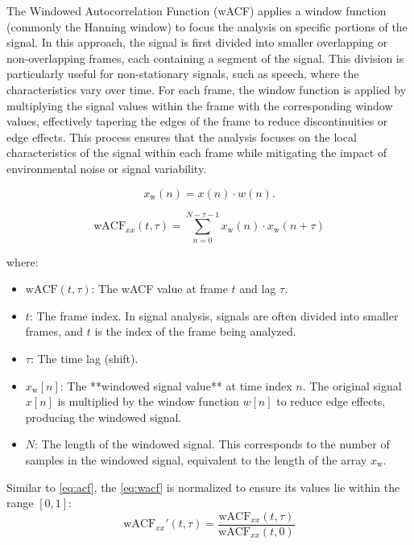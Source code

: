 \documentclass{ieeeaccess}
\begin{document}
The Windowed Autocorrelation Function (wACF) applies a window function (commonly the Hanning window) to focus the analysis on specific portions of the signal. In this approach, the signal is first divided into smaller overlapping or non-overlapping frames, each containing a segment of the signal. This division is particularly useful for non-stationary signals, such as speech, where the characteristics vary over time. For each frame, the window function is applied by multiplying the signal values within the frame with the corresponding window values, effectively tapering the edges of the frame to reduce discontinuities or edge effects. This process ensures that the analysis focuses on the local characteristics of the signal within each frame while mitigating the impact of environmental noise or signal variability.

\begin{equation}
x_{\text{w}}(n) = x(n) \cdot w(n).
\label{eq:windowed_signal}
\end{equation}


\begin{equation}
\text{wACF}_{xx}(t, \tau) = \sum_{n=0}^{N-\tau-1} x_{\text{w}}(n)\cdot x_{\text{w}}(n+\tau)
\label{eq:wacf}
\end{equation}


\noindent where:
\begin{itemize}
    \item $\text{wACF}(t, \tau)$: The wACF value at frame $t$ and lag $\tau$.
    \item $t$: The frame index. In signal analysis, signals are often divided into smaller frames, and $t$ is the index of the frame being analyzed.
    \item $\tau$: The time lag (shift).
    \item $x_{\text{w}}[n]$: The **windowed signal value** at time index $n$. The original signal $x[n]$ is multiplied by the window function $w[n]$ to reduce edge effects, producing the windowed signal.
    \item $N$: The length of the windowed signal. This corresponds to the number of samples in the windowed signal, equivalent to the length of the array $x_{\text{w}}$.
\end{itemize}

Similar to \eqref{eq:acf}, the \eqref{eq:wacf} is normalized to ensure its values lie within the range $[0, 1]$:
\begin{equation}
\text{wACF}_{xx}'(t, \tau) = \frac{\text{wACF}_{xx}(t, \tau)}{\text{wACF}_{xx}(t, 0)}
\label{eq:normalized_wacf}
\end{equation}
\end{document}
